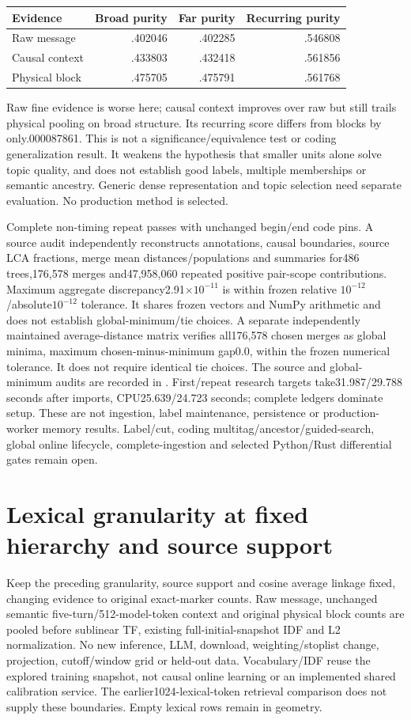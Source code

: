 \documentclass[11pt]{article}
\begin{document}
\begin{center}
\begin{tabular}{lrrr}
Evidence & Broad purity & Far purity & Recurring purity\\
\hline
Raw message & .402046 & .402285 & .546808\\
Causal context & .433803 & .432418 & .561856\\
Physical block & .475705 & .475791 & .561768\\
\end{tabular}
\end{center}
Raw fine evidence is worse here; causal context improves over raw but still
trails physical pooling on broad structure. Its recurring score differs from
blocks by only.000087861. This is not a significance/equivalence test or coding
generalization result. It weakens the hypothesis that smaller units alone
solve topic quality, and does not establish good labels, multiple memberships
or semantic ancestry. Generic dense representation and topic selection need
separate evaluation. No production method is selected.

Complete non-timing repeat passes with unchanged begin/end code pins. A
source audit independently reconstructs annotations, causal boundaries,
source LCA fractions, merge mean distances/populations and summaries for486
trees,176,578 merges and47,958,060 repeated positive pair-scope contributions.
Maximum aggregate discrepancy2.91$\times10^{-11}$ is within frozen relative
$10^{-12}$/absolute$10^{-12}$ tolerance. It shares frozen vectors and NumPy
arithmetic and does not establish global-minimum/tie choices. A separate
independently maintained average-distance matrix verifies all176,578 chosen
merges as global minima, maximum chosen-minus-minimum gap0.0, within the
frozen numerical tolerance. It does not require identical tie choices. The
source and global-minimum audits are recorded in
.
First/repeat research targets take31.987/29.788 seconds after imports,
CPU25.639/24.723 seconds; complete ledgers dominate setup. These are not
ingestion, label maintenance, persistence or production-worker memory results.
Label/cut, coding multitag/ancestor/guided-search, global online lifecycle,
complete-ingestion and selected Python/Rust differential gates remain open.

\section{Lexical granularity at fixed hierarchy and source support}
Keep the preceding granularity, source support and cosine average linkage
fixed, changing evidence to original exact-marker counts. Raw message,
unchanged semantic five-turn/512-model-token context and original physical
block counts are pooled before sublinear TF, existing full-initial-snapshot
IDF and L2 normalization. No new inference, LLM, download, weighting/stoplist
change, projection, cutoff/window grid or held-out data. Vocabulary/IDF reuse
the explored training snapshot, not causal online learning or an implemented
shared calibration service. The earlier1024-lexical-token retrieval comparison
does not supply these boundaries. Empty lexical rows remain in geometry.
\end{document}
